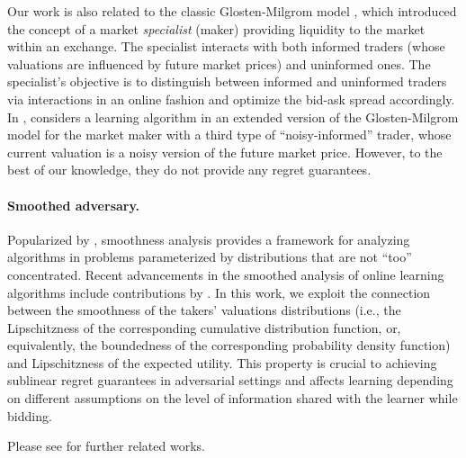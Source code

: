 \documentclass[final,12pt]{colt2025}
\begin{document}
Our work is also related to the classic Glosten-Milgrom model \citep{glostenBidAskTransaction1985}, which introduced the concept of a market \textit{specialist} (maker) providing liquidity to the market within an exchange. 
The specialist interacts with both informed traders (whose valuations are influenced by future market prices) and uninformed ones.
The specialist's objective is to distinguish between informed and uninformed traders via interactions in an online fashion and optimize the bid-ask spread accordingly. 
In \citeyear{learnigmarketmakerGlostenMilgrom2005}, \citeauthor{learnigmarketmakerGlostenMilgrom2005} considers a learning algorithm in an extended version of the Glosten-Milgrom model for the market maker with a third type of ``noisy-informed'' trader, whose current valuation is a noisy version of the future market price. However, to the best of our knowledge, they do not provide any regret guarantees.

\paragraph{Smoothed adversary.}
Popularized by \citet{spielman2004smoothed,rakhlin2011online,haghtalab2020smoothed}, smoothness analysis provides a framework for analyzing algorithms in problems parameterized by distributions that are not ``too'' concentrated. 
Recent advancements in the smoothed analysis of online learning algorithms include contributions by \citet{kannan2018smoothed,haghtalaboracle,HaghtalabRS21,block2022smoothed,DurvasulaHZ23,cesa2021regret,cesa2023repeated,bolic2024online,JMLR:v25:23-1627}.
In this work, we exploit the connection between the smoothness of the takers' valuations distributions (i.e., the Lipschitzness of the corresponding cumulative distribution function, or, equivalently, the boundedness of the corresponding probability density function) and Lipschitzness of the expected utility. 
This property is crucial to achieving sublinear regret guarantees in adversarial settings and
affects learning depending on different assumptions on the level of information shared with the learner while bidding.

Please see  for further related works.
\end{document}
